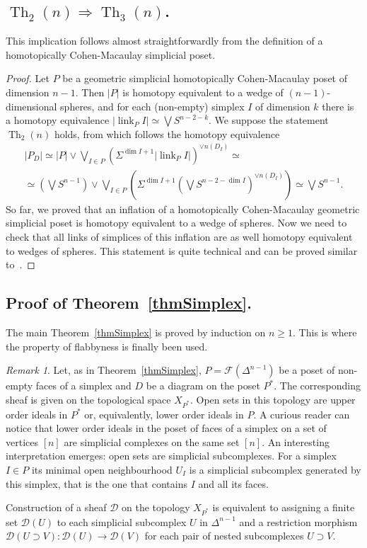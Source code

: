 \documentclass[english,12pt,oneside]{amsproc}
\DeclareMathOperator{\link}{link}
\DeclareMathOperator{\Th}{Th}
\newcommand{\ca}[1]{\mathcal{#1}}
\newcounter{stmcounter}[section]
\numberwithin{equation}{section}
\theoremstyle{plain}
\theoremstyle{definition}
\theoremstyle{remark}
\newtheorem{rem}[stmcounter]{Remark}
\begin{document}
\subsection{$\Th_2(n)\Rightarrow\Th_3(n)$.}

This implication follows almost straightforwardly from the definition of a homotopically Cohen-Macaulay simplicial poset.

\begin{proof}
Let $P$ be a geometric simplicial homotopically Cohen-Macaulay poset of dimension $n-1$. Then $|P|$ is homotopy equivalent to a wedge of $(n-1)$-dimensional spheres,  and  for each (non-empty) simplex $I$ of dimension $k$ there is a homotopy equivalence $|\link_PI|\simeq \bigvee S^{n-2-k}$. We suppose the statement $\Th_2(n)$ holds, from which follows the homotopy equivalence
\begin{multline}
  |P_D|\simeq |P|\vee\bigvee\nolimits_{I\in P}(\Sigma^{\dim I+1}|\link_PI|)^{\vee n(D_I)}\simeq \\
  \simeq \left(\bigvee S^{n-1}\right)\vee\bigvee\nolimits_{I\in P}(\Sigma^{\dim I+1}\left(\bigvee S^{n-2-\dim I}\right)^{\vee n(D_I)})\simeq \bigvee S^{n-1}.
\end{multline}
So far, we proved that an inflation of a homotopically Cohen-Macaulay geometric simplicial poset is homotopy equivalent to a wedge of spheres. Now we need to check that all links of simplices of this inflation are as well homotopy equivalent to wedges of spheres. This statement is quite technical and can be proved similar to~\cite[Stm.~5.8]{AyzRukh}.
\end{proof}

\subsection{Proof of Theorem~\ref{thmSimplex}.}

The main Theorem~\ref{thmSimplex} is proved by induction on $n\geqslant 1$. This is where the property of flabbyness is finally been used.

\begin{rem}\label{remOpenSubcomplexes}
Let, as in Theorem~\ref{thmSimplex}, $P=\ca{F}(\Delta^{n-1})$ be a poset of non-empty faces of a simplex  and  $D$ be a diagram on the poset $P^*$. The corresponding sheaf is given on the topological space $X_{P^*}$. Open sets in this topology are upper order ideals in $P^*$ or, equivalently, lower order ideals in $P$. A curious reader can notice that lower order ideals in the poset of faces of a simplex on a set of vertices $[n]$ are simplicial complexes on the same set $[n]$. An interesting interpretation emerges: open sets are simplicial subcomplexes. For a simplex $I\in P$ its minimal open neighbourhood $U_I$ is a simplicial subcomplex generated by this simplex, that is the one that contains $I$ and  all its faces.

Construction of a sheaf $\ca{D}$ on the topology $X_{P^*}$ is equivalent to assigning a finite set $\ca{D}(U)$ to each simplicial subcomplex $U$ in $\Delta^{n-1}$  and  a restriction morphism $\ca{D}(U\supset V)\colon \ca{D}(U)\to \ca{D}(V)$ for each pair of nested subcomplexes $U\supset V$.
\end{rem}
\end{document}
